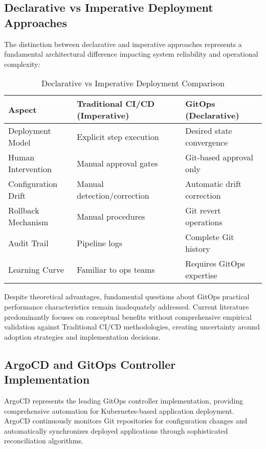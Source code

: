 \subsection{Declarative vs Imperative Deployment Approaches}

The distinction between declarative and imperative approaches represents a fundamental architectural difference impacting system reliability and operational complexity:

\begin{table}[h]
\centering
\begin{tabular}{|l|l|l|}
\hline
\textbf{Aspect} & \textbf{Traditional CI/CD (Imperative)} & \textbf{GitOps (Declarative)} \\
\hline
Deployment Model & Explicit step execution & Desired state convergence \\
\hline
Human Intervention & Manual approval gates & Git-based approval only \\
\hline
Configuration Drift & Manual detection/correction & Automatic drift correction \\
\hline
Rollback Mechanism & Manual procedures & Git revert operations \\
\hline
Audit Trail & Pipeline logs & Complete Git history \\
\hline
Learning Curve & Familiar to ops teams & Requires GitOps expertise \\
\hline
\end{tabular}
\caption{Declarative vs Imperative Deployment Comparison}
\end{table}

Despite theoretical advantages, fundamental questions about GitOps practical performance characteristics remain inadequately addressed. Current literature predominantly focuses on conceptual benefits without comprehensive empirical validation against Traditional CI/CD methodologies, creating uncertainty around adoption strategies and implementation decisions.

\subsection{ArgoCD and GitOps Controller Implementation}

ArgoCD represents the leading GitOps controller implementation, providing comprehensive automation for Kubernetes-based application deployment. ArgoCD continuously monitors Git repositories for configuration changes and automatically synchronizes deployed applications through sophisticated reconciliation algorithms.

